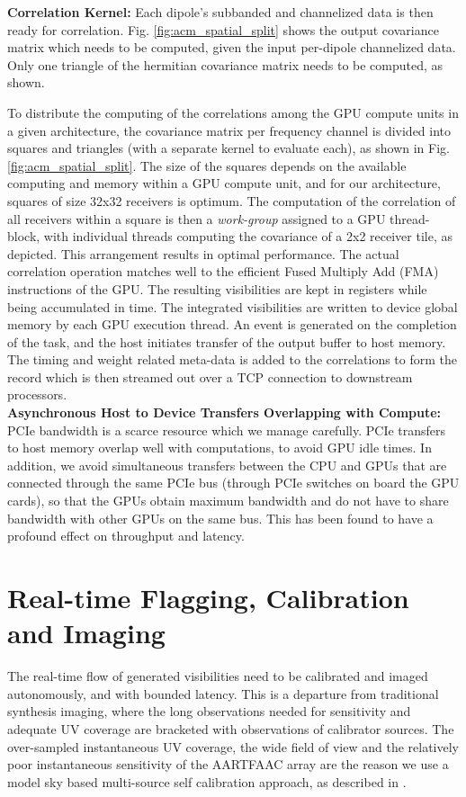 \documentclass{ws-jai}
\begin{document}
\noindent \textbf {Correlation Kernel:}  Each dipole's subbanded and channelized
data is then ready for  correlation.  Fig. \ref{fig:acm_spatial_split} shows the
output covariance matrix which needs to  be computed, given the input per-dipole
channelized data. Only  one triangle of the hermitian  covariance matrix needs
to be computed, as shown.

To distribute the computing of the correlations among the GPU compute units in a
given architecture, the covariance matrix  per frequency channel is divided into
squares and  triangles (with a  separate kernel to  evaluate each), as  shown in
Fig.   \ref{fig:acm_spatial_split}.  The size  of  the  squares depends  on  the
available  computing  and  memory  within  a  GPU  compute  unit,  and  for  our
architecture, squares of size 32x32 receivers is optimum. The computation of the
correlation of  all receivers  within a  square is  then a  \textit {work-group}
assigned to a GPU thread-block, with individual threads computing the covariance
of  a 2x2  receiver  tile,  as depicted.  This  arrangement  results in  optimal
performance.  The  actual correlation  operation matches  well to  the efficient
Fused Multiply  Add (FMA) instructions  of the GPU.  The  resulting visibilities
are  kept  in  registers  while   being  accumulated  in  time.  The  integrated
visibilities are written  to device global memory by each  GPU execution thread.
An event  is generated  on the completion  of the task,  and the  host initiates
transfer of  the output buffer  to host memory.   The timing and  weight related
meta-data is added to the correlations to form the record which is then streamed
out over a TCP connection to downstream processors.\\

\noindent  \textbf  {Asynchronous  Host  to Device  Transfers  Overlapping  with
  Compute:} PCIe bandwidth is a scarce  resource which we manage carefully. PCIe
transfers  to host  memory overlap  well with  computations, to  avoid GPU  idle
times. In  addition, we avoid  simultaneous transfers  between the CPU  and GPUs
that are connected through the same PCIe bus (through PCIe switches on board the
GPU cards), so that  the GPUs obtain maximum bandwidth and do  not have to share
bandwidth  with other  GPUs on  the same  bus.  This has  been found  to have  a
profound effect on throughput and latency.\\

\section {\label{sec:calim} Real-time Flagging, Calibration and Imaging}
The real-time  flow of generated visibilities  need to be calibrated  and imaged
autonomously, and  with bounded latency.   This is a departure  from traditional
synthesis  imaging,  where the  long  observations  needed for  sensitivity  and
adequate UV coverage are bracketed  with observations of calibrator sources. The
over-sampled  instantaneous  UV  coverage,  the  wide  field  of  view  and  the
relatively poor instantaneous  sensitivity of the AARTFAAC array  are the reason
we use a model sky based multi-source self calibration approach, as described in
\cite {prasad2014real}.
\end{document}
